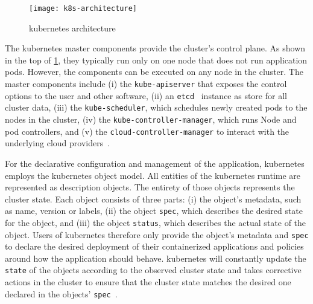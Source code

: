   \begin{figure}
    \centering
    \texttt{[image: k8s-architecture]}
    \caption{\Gls{kubernetes} architecture}
    \label{fig:kubernetes-architecture}
  \end{figure}

  The \gls{kubernetes} master components provide the cluster's control plane.
  As shown in the top of \cref{fig:kubernetes-architecture}, they typically run only on one node that does not run application pods.
  However, the components can be executed on any node in the cluster.
  The master components include
  (i) the \texttt{kube-apiserver} that exposes the control options to the user and other software,
  (ii) an \texttt{etcd}~\cite{etcd} instance as store for all cluster data,
  (iii) the \texttt{kube-scheduler}, which schedules newly created pods to the nodes in the cluster,
  (iv) the \texttt{kube-controller-manager}, which runs Node and \glspl{pod controller}, and
  (v) the \texttt{cloud-controller-manager} to interact with the underlying cloud providers~\cite{kubernetesdoc}.

  For the declarative configuration and management of the application, \gls{kubernetes} employs the \gls{kubernetes} object model.
  All entities of the \gls{kubernetes} runtime are represented as description objects.
  The entirety of those objects represents the cluster state.
  Each object consists of three parts:
  (i) the object's metadata, such as name, version or labels,
  (ii) the object \texttt{spec}, which describes the desired state for the object, and
  (iii) the object \texttt{status}, which describes the actual state of the object.
  Users of \gls{kubernetes} therefore only provide the object's metadata and \texttt{spec} to declare the desired deployment of their containerized applications and policies around how the application should behave.
  \Gls{kubernetes} will constantly update the \texttt{state} of the objects according to the observed cluster state and takes corrective actions in the cluster to ensure that the cluster state matches the desired one declared in the objects' \texttt{spec}~\cite{kubernetesdoc}.

